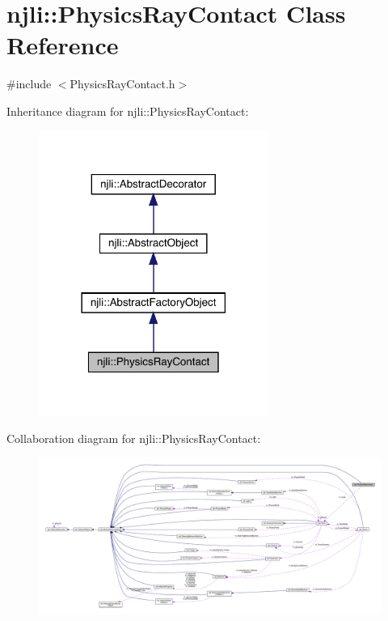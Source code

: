 \hypertarget{classnjli_1_1_physics_ray_contact}{}\section{njli\+:\+:Physics\+Ray\+Contact Class Reference}
\label{classnjli_1_1_physics_ray_contact}


{\ttfamily \#include $<$Physics\+Ray\+Contact.\+h$>$}



Inheritance diagram for njli\+:\+:Physics\+Ray\+Contact\+:\nopagebreak
\begin{figure}[H]
\begin{center}
\leavevmode
\includegraphics[width=213pt]{classnjli_1_1_physics_ray_contact__inherit__graph}
\end{center}
\end{figure}


Collaboration diagram for njli\+:\+:Physics\+Ray\+Contact\+:\nopagebreak
\begin{figure}[H]
\begin{center}
\leavevmode
\includegraphics[width=350pt]{classnjli_1_1_physics_ray_contact__coll__graph}
\end{center}
\end{figure}

